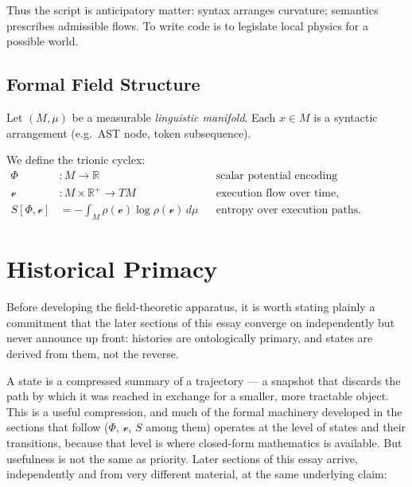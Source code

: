 \documentclass[12pt,a4paper]{article}
\theoremstyle{plain}
\theoremstyle{definition}
\theoremstyle{remark}
\newcommand{\Phifield}{\Phi}
\newcommand{\vfield}{\mathcal{v}}
\newcommand{\Sfield}{S}
\begin{document}
Thus the script is anticipatory matter: syntax arranges curvature; semantics prescribes admissible flows. To write code is to legislate local physics for a possible world.

\subsection{Formal Field Structure}
Let $(M,\mu)$ be a measurable \emph{linguistic manifold}. Each $x\!\in\!M$ is a syntactic arrangement (e.g.\ AST node, token subsequence).

We define the trionic cyclex:
\begin{align}
\Phifield &: M \to \mathbb{R} && \text{scalar potential encoding syntactic/semantic energy,} \\
\vfield &: M \times \mathbb{R}^{+} \to TM && \text{execution flow over time,} \\
\Sfield[\Phifield,\vfield] &= -\!\int_M \rho(\vfield)\log\rho(\vfield)\,d\mu && \text{entropy over execution paths.}
\end{align}

\section{Historical Primacy}
\label{sec:historical-primacy}

Before developing the field-theoretic apparatus, it is worth stating plainly a commitment that the later sections of this essay converge on independently but never announce up front: histories are ontologically primary, and states are derived from them, not the reverse.

A state is a compressed summary of a trajectory — a snapshot that discards the path by which it was reached in exchange for a smaller, more tractable object. This is a useful compression, and much of the formal machinery developed in the sections that follow ($\Phifield$, $\vfield$, $\Sfield$ among them) operates at the level of states and their transitions, because that level is where closed-form mathematics is available. But usefulness is not the same as priority. Later sections of this essay arrive, independently and from very different material, at the same underlying claim:
\end{document}
